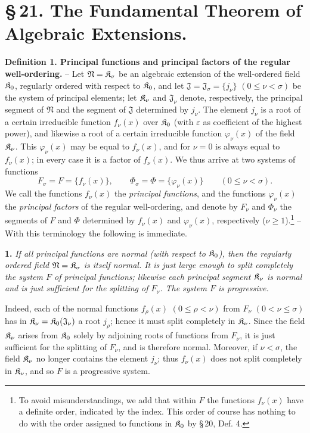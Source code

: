 \section*{\S\,21. The Fundamental Theorem of Algebraic Extensions.}

\textbf{Definition 1. Principal functions and principal factors of the regular well-ordering.} -- Let $\mathfrak N=\mathfrak K_\sigma$ be an algebraic extension of the well-ordered field $\mathfrak K_0$, regularly ordered with respect to $\mathfrak K_0$, and let $\mathfrak J=\mathfrak J_\sigma=\{j_\nu\}$ $(0\leq\nu<\sigma)$ be the system of principal elements; let $\mathfrak K_\nu$ and $\mathfrak J_\nu$ denote, respectively, the principal segment of $\mathfrak N$ and the segment of $\mathfrak J$ determined by $j_\nu$. The element $j_\nu$ is a root of a certain irreducible function $f_\nu(x)$ over $\mathfrak K_0$ (with $\varepsilon$ as coefficient of the highest power), and likewise a root of a certain irreducible function $\varphi_\nu(x)$ of the field $\mathfrak K_\nu$. This $\varphi_\nu(x)$ may be equal to $f_\nu(x)$, and for $\nu=0$ is always equal to $f_\nu(x)$; in every case it is a factor of $f_\nu(x)$. We thus arrive at two systems of functions
\[
F_\sigma=F=\{f_\nu(x)\},\qquad \Phi_\sigma=\Phi=\{\varphi_\nu(x)\}\qquad (0\leq \nu<\sigma).
\]
We call the functions $f_\nu(x)$ the \emph{principal functions}, and the functions $\varphi_\nu(x)$ the \emph{principal factors} of the regular well-ordering, and denote by $F_\nu$ and $\Phi_\nu$ the segments of $F$ and $\Phi$ determined by $f_\nu(x)$ and $\varphi_\nu(x)$, respectively ($\nu\geq1$).\footnote{To avoid misunderstandings, we add that within $F$ the functions $f_\nu(x)$ have a definite order, indicated by the index. This order of course has nothing to do with the order assigned to functions in $\mathfrak K_0$ by \S\,20, Def. 4.} -- With this terminology the following is immediate.

\textbf{1.} \emph{If all principal functions are normal (with respect to $\mathfrak K_0$), then the regularly ordered field $\mathfrak N=\mathfrak K_\sigma$ is itself normal. It is just large enough to split completely the system $F$ of principal functions; likewise each principal segment $\mathfrak K_\nu$ is normal and is just sufficient for the splitting of $F_\nu$. The system $F$ is progressive.}

Indeed, each of the normal functions $f_\rho(x)$ $(0\leq \rho<\nu)$ from $F_\nu$ $(0<\nu\leq\sigma)$ has in $\mathfrak K_\nu=\mathfrak K_0(\mathfrak J_\nu)$ a root $j_\rho$; hence it must split completely in $\mathfrak K_\nu$. Since the field $\mathfrak K_\nu$ arises from $\mathfrak K_0$ solely by adjoining roots of functions from $F_\nu$, it is just sufficient for the splitting of $F_\nu$, and is therefore normal. Moreover, if $\nu<\sigma$, the field $\mathfrak K_\nu$ no longer contains the element $j_\nu$; thus $f_\nu(x)$ does not split completely in $\mathfrak K_\nu$, and so $F$ is a progressive system.

